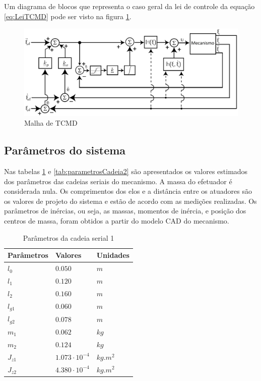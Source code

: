 \documentclass[]{politex}
\begin{document}
Um diagrama de blocos que representa o caso geral da lei de controle da equação \eqref{eq:LeiTCMD} pode ser visto na figura \ref{fig:TCMD}.

\begin{figure}[h]
	\centering
	\includegraphics[scale=0.39]{../figures/TCMD.jpg}  
	\caption{Malha de TCMD}
	\label{fig:TCMD}
\end{figure}


\subsection{Parâmetros do sistema}

Nas tabelas \ref{tab:parametrosCadeia1} e \ref{tab:parametrosCadeia2} são apresentados os valores estimados dos parâmetros das cadeias seriais do mecanismo. A massa do efetuador é considerada nula. Os comprimentos dos elos e a distância entre os atuadores são os valores de projeto do sistema e estão de acordo com as medições realizadas. Os parâmetros de inércias, ou seja, as massas, momentos de inércia, e posição dos centros de massa, foram obtidos a partir do modelo CAD do mecanismo. 

\begin{table}[H] 
\centering
\caption{Parâmetros da cadeia serial 1}
\label{tab:parametrosCadeia1}
\begin{tabular}{l|l|l}
Parâmetros   & Valores                  & Unidades      \\ \hline
$l_0$        & $0.050$                     & $m$        \\
$l_1$        & $0.120$                     & $m$        \\
$l_2$        & $0.160$                     & $m$        \\
$l_{g1}$     & $0.060$                     & $m$        \\
$l_{g2}$     & $0.078$                    & $m$        \\
$m_1$        & $0.062$                    & $kg$       \\
$m_2$        & $0.124$                    & $kg$       \\
$J_{z1}$     & $1.073 \cdot 10^{-4}$    & $kg.m^{2}$ \\
$J_{z2}$     & $4.380 \cdot 10^{-4}$    & $kg.m^{2}$ \\
\end{tabular}
\end{table} 
\end{document}
